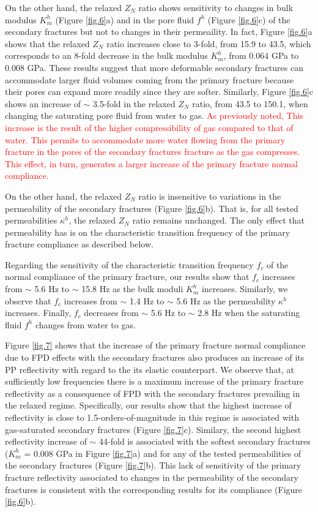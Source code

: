 \documentclass[draft]{agujournal2019}
\newcommand{\red}{\textcolor{red}}
\begin{document}
On the other hand, the relaxed $Z_N$ ratio shows sensitivity to changes in bulk modulus $K_m^h$ (Figure \ref{fig.6}a) and in the pore fluid $f^h$ (Figure \ref{fig.6}c) of the secondary fractures but not to changes in their permeaility. In fact, Figure \ref{fig.6}a shows that the relaxed $Z_N$ ratio increases close to 3-fold, from 15.9 to 43.5, which corresponds to an 8-fold decrease in the bulk modulus $K_m^h$, from 0.064 GPa to 0.008 GPa. These results suggest that  more deformable secondary fractures can accommodate larger fluid volumes coming from the primary fracture because their pores can expand more readily since they are softer.
Similarly, Figure \ref{fig.6}c shows an increase of $\sim$ 3.5-fold in the relaxed $Z_N$ ratio, from 43.5 to 150.1, when changing the saturating pore fluid from water to gas. 
\red{As previously noted, This increase is the result of the higher compressibility of gas compared to that of water. This permits to accommodate more water flowing from the primary fracture in the pores of the secondary fractures fracture as the gas compresses. This effect, in turn,  generates a larger increase of the primary fracture normal compliance.
}

On the other hand, the relaxed $Z_N$ ratio is insensitive to variations in the permeability of the secondary fractures (Figure \ref{fig.6}b). That is, for all tested permeabilities $\kappa^h$, the relaxed $Z_N$ ratio remains unchanged. The only effect that permeability has is on the characteristic transition frequency of the primary fracture compliance as described below.

Regarding the sensitivity of the characteristic transition frequency $f_c$ of the normal compliance of the primary fracture, our results show that $f_c$ increases from $\sim$ 5.6 Hz to $\sim$ 15.8 Hz as the bulk moduli $K_m^h$ increases. Similarly, we observe that $f_c$ increases from $\sim$ 1.4 Hz to $\sim$  5.6 Hz as the permeability $\kappa^h$ increases. Finally, $f_c$ decreases from $\sim$ 5.6 Hz to $\sim$ 2.8 Hz when the saturating fluid $f^h$ changes from water to gas.

Figure \ref{fig.7} shows that the increase of the primary fracture normal compliance due to FPD effects with the secondary fractures also produces an increase of its PP reflectivity with regard to the its elastic counterpart. We observe that, at sufficiently low frequencies there is a maximum increase of the primary fracture reflectivity as a consequence of FPD with the secondary fractures prevailing in the relaxed regime. Specifically, our results show that the highest increase of reflectivity is close to 1.5-orders-of-magnitude in this regime is associated with gas-saturated secondary fractures (Figure \ref{fig.7}c). Similary, the second highest reflectivity increase of $\sim$ 44-fold is associated with the softest secondary fractures ($K_m^h$ = 0.008 GPa in Figure \ref{fig.7}a) and for any of the tested permeabilities of the secondary fractures (Figure \ref{fig.7}b). This lack of sensitivity of the primary fracture reflectivity associated to changes in the permeability of the secondary fractures is consistent with the corresponding results for its compliance (Figure \ref{fig.6}b).  
\end{document}

